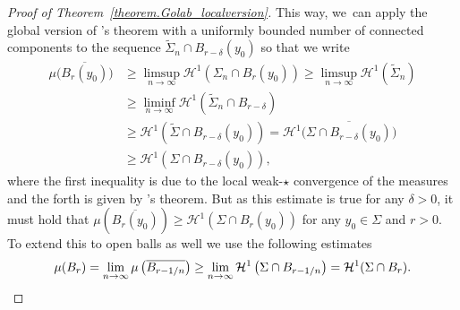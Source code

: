 \documentclass[11pt]{article}
\numberwithin{equation}{section}
\theoremstyle{definition}
\newcommand\cH{\mathcal{H}}
\begin{document}
\begin{proof}[Proof of Theorem~\ref{theorem.Golab_localversion}]
This way, we~can apply the global version of \Golab's theorem with a uniformly bounded number of connected components to the sequence $\tilde \Sigma_n \cap B_{r - \delta}(y_0)$ so that we write
\begin{align*}
\mu\bigl(\overline{B_r(y_0)}\bigr)
&\ge
\limsup_{n \to \infty} \cH^1\left(\Sigma_n \cap B_r(y_0)\right)
\ge
\limsup_{n \to \infty} \cH^1(\tilde \Sigma_n)\\
&\ge
\liminf_{n \to \infty} \cH^1(\tilde \Sigma_n\cap B_{r-\delta})\\
&\ge
\cH^1(\tilde \Sigma\cap B_{r-\delta}(y_0))
= \cH^1\bigl(\overline{\Sigma\cap B_{r-\delta}(y_0)}\bigr)\\
&\ge
\cH^1(\Sigma\cap B_{r-\delta}(y_0)),
\end{align*}
where the first inequality is due to the local weak-$\star$ convergence of the measures and the forth is given by \Golab's theorem. But as this estimate is true for any $\delta > 0$, it must hold that $\mu\left(\overline{B_r(y_0)}\right) \ge \cH^1\left(\Sigma\cap B_{r}(y_0)\right)$ for any $y_0 \in \Sigma$ and $r > 0$. To extend this to open balls as well we use the following estimates
\begin{equation*}
\mu(B_r)
=
\lim_{n \to \infty} \mu\left(\overline{B_{r - 1/n}}\right)
\ge
\lim_{n \to \infty} \mathcal{H}^1\left(\Sigma\cap B_{r - 1/n}\right)
= \mathcal{H}^1(\Sigma\cap B_r).\qedhere
\end{equation*}
\end{proof}

\pagebreak[2]

\end{document}
